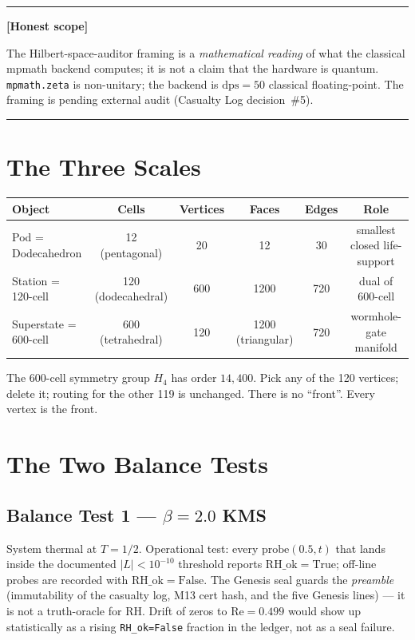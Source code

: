 \documentclass[11pt,letterpaper]{article}
\newenvironment{honest}%
  {\par\medskip\noindent\rule{\linewidth}{0.5pt}\par\nopagebreak\textbf{[Honest scope]}\par\nopagebreak\small}%
  {\par\nopagebreak\normalsize\rule{\linewidth}{0.5pt}\par\medskip}
\begin{document}
\begin{honest}
The Hilbert-space-auditor framing is a \emph{mathematical reading} of what
the classical mpmath backend computes; it is not a claim that the hardware is
quantum. \texttt{mpmath.zeta} is non-unitary; the backend is
$\mathrm{dps} = 50$ classical floating-point. The framing is pending external
audit (Casualty Log decision~\#5).
\end{honest}

\section{The Three Scales}
\label{sec:scales}

\begin{center}
\begin{tabular}{lccccc}
\toprule
\textbf{Object} & \textbf{Cells} & \textbf{Vertices} & \textbf{Faces} & \textbf{Edges} & \textbf{Role} \\
\midrule
Pod = Dodecahedron & 12 (pentagonal) & 20 & 12 & 30 & smallest closed life-support \\
Station = 120-cell & 120 (dodecahedral) & 600 & 1200 & 720 & dual of 600-cell \\
Superstate = 600-cell & 600 (tetrahedral) & 120 & 1200 (triangular) & 720 & wormhole-gate manifold \\
\bottomrule
\end{tabular}
\end{center}

The 600-cell symmetry group $H_4$ has order $14{,}400$. Pick any of the 120
vertices; delete it; routing for the other 119 is unchanged. There is no
``front''. Every vertex is the front.

\section{The Two Balance Tests}
\label{sec:balance}

\subsection{Balance Test 1 --- $\beta = 2.0$ KMS}
System thermal at $T = 1/2$. Operational test: every $\mathrm{probe}(0.5, t)$
that lands inside the documented $|L| < 10^{-10}$ threshold reports
$\mathrm{RH\_ok} = \mathrm{True}$; off-line probes are recorded with
$\mathrm{RH\_ok} = \mathrm{False}$. The Genesis seal guards the
\emph{preamble} (immutability of the casualty log, M13 cert hash, and the
five Genesis lines) --- it is not a truth-oracle for RH. Drift of zeros
to $\mathrm{Re} = 0.499$ would show up statistically as a rising
\texttt{RH\_ok=False} fraction in the ledger, not as a seal failure.
\end{document}
